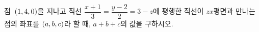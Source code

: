 점~$(1{,}\mkern3mu\mathopen{}4{,}\mkern3mu\mathopen{}0)$을 지나고 직선 $\dfrac{x+1}{3}=\dfrac{y-2}{2}=3-z$에 평행한 직선이 $zx$평면과 만나는 점의 좌표를 $(a{,}\mkern3mu\mathopen{}b{,}\mkern3mu\mathopen{}c)$라 할 때, $a+b+c$의 값을 구하시오.
